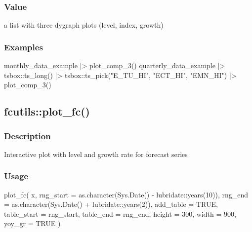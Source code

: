 \documentclass[
  letterpaper,
  DIV=11,
  numbers=noendperiod]{scrreport}
\newenvironment{Shaded}{\begin{snugshade}}{\end{snugshade}}
\newcommand{\AttributeTok}[1]{\textcolor[rgb]{0.40,0.45,0.13}{#1}}
\newcommand{\ConstantTok}[1]{\textcolor[rgb]{0.56,0.35,0.01}{#1}}
\newcommand{\DecValTok}[1]{\textcolor[rgb]{0.68,0.00,0.00}{#1}}
\newcommand{\FunctionTok}[1]{\textcolor[rgb]{0.28,0.35,0.67}{#1}}
\newcommand{\NormalTok}[1]{\textcolor[rgb]{0.00,0.23,0.31}{#1}}
\newcommand{\SpecialCharTok}[1]{\textcolor[rgb]{0.37,0.37,0.37}{#1}}
\newcommand{\StringTok}[1]{\textcolor[rgb]{0.13,0.47,0.30}{#1}}
\begin{document}
\subsubsection{Value}\label{value-64}

a list with three dygraph plots (level, index, growth)

\subsubsection{Examples}\label{examples-66}

\begin{Shaded}
\begin{Highlighting}[]
\NormalTok{monthly\_data\_example }\SpecialCharTok{|\textgreater{}}
  \FunctionTok{plot\_comp\_3}\NormalTok{()}
\NormalTok{quarterly\_data\_example }\SpecialCharTok{|\textgreater{}}
\NormalTok{  tsbox}\SpecialCharTok{::}\FunctionTok{ts\_long}\NormalTok{() }\SpecialCharTok{|\textgreater{}}
\NormalTok{  tsbox}\SpecialCharTok{::}\FunctionTok{ts\_pick}\NormalTok{(}\StringTok{"E\_TU\_HI"}\NormalTok{, }\StringTok{"ECT\_HI"}\NormalTok{, }\StringTok{"EMN\_HI"}\NormalTok{) }\SpecialCharTok{|\textgreater{}}
  \FunctionTok{plot\_comp\_3}\NormalTok{()}
\end{Highlighting}
\end{Shaded}

\subsection{fcutils::plot\_fc()}\label{fcutilsplot_fc}

\subsubsection{Description}\label{description-67}

Interactive plot with level and growth rate for forecast series

\subsubsection{Usage}\label{usage-67}

\begin{Shaded}
\begin{Highlighting}[]
\FunctionTok{plot\_fc}\NormalTok{(}
\NormalTok{  x,}
  \AttributeTok{rng\_start =} \FunctionTok{as.character}\NormalTok{(}\FunctionTok{Sys.Date}\NormalTok{() }\SpecialCharTok{{-}}\NormalTok{ lubridate}\SpecialCharTok{::}\FunctionTok{years}\NormalTok{(}\DecValTok{10}\NormalTok{)),}
  \AttributeTok{rng\_end =} \FunctionTok{as.character}\NormalTok{(}\FunctionTok{Sys.Date}\NormalTok{() }\SpecialCharTok{+}\NormalTok{ lubridate}\SpecialCharTok{::}\FunctionTok{years}\NormalTok{(}\DecValTok{2}\NormalTok{)),}
  \AttributeTok{add\_table =} \ConstantTok{TRUE}\NormalTok{,}
  \AttributeTok{table\_start =}\NormalTok{ rng\_start,}
  \AttributeTok{table\_end =}\NormalTok{ rng\_end,}
  \AttributeTok{height =} \DecValTok{300}\NormalTok{,}
  \AttributeTok{width =} \DecValTok{900}\NormalTok{,}
  \AttributeTok{yoy\_gr =} \ConstantTok{TRUE}
\NormalTok{)}
\end{Highlighting}
\end{Shaded}
\end{document}
